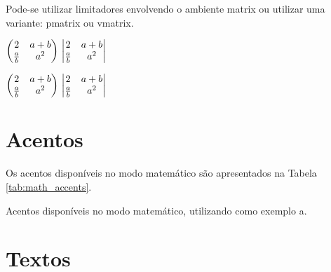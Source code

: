 Pode-se utilizar limitadores envolvendo o ambiente \textsf{matrix} ou utilizar uma variante: \textsf{pmatrix} ou \textsf{vmatrix}. \\
\begin{minipage}[t]{0.47\linewidth} \vspace{-8pt}
    \begin{latexcode}
        $\begin{pmatrix}
            2 & a+b \\
            \frac{a}{b} & a^2
        \end{pmatrix} \\
        \begin{vmatrix}
            2 & a+b \\
            \frac{a}{b} & a^2
        \end{vmatrix}$
    \end{latexcode}
\end{minipage} \hfill
\begin{minipage}[t]{0.47\linewidth} \vspace{0pt}
    $\begin{pmatrix}
        2 & a+b \\
        \frac{a}{b} & a^2
    \end{pmatrix} \\
    \begin{vmatrix}
        2 & a+b \\
        \frac{a}{b} & a^2
    \end{vmatrix}$
\end{minipage}

\section{Acentos}
Os acentos disponíveis no modo matemático são apresentados na Tabela \ref{tab:math_accents}.
\begin{table}[h!tb]
    \centering
    \caption{Acentos disponíveis no modo matemático, utilizando como exemplo \textsf{a}.}
    \label{tab:math_accents}
\end{table}

\section{Textos}

